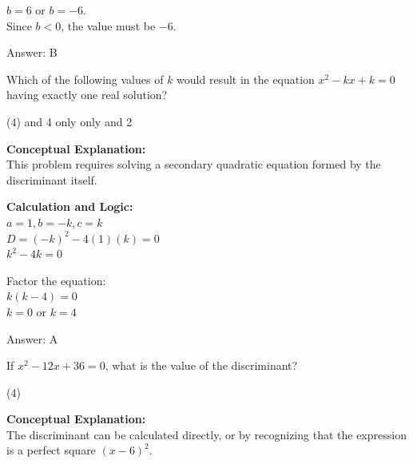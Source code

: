 \documentclass[11pt,paper=a4,answers]{exam}
\begin{document}
\begin{questions}
\begin{solution}
\vspace{10pt}

$b = 6$ or $b = -6$. \\
Since $b < 0$, the value must be $-6$.

\vspace{25pt}

Answer: \colorbox{yellow!100}{B}
\end{solution}

\vspace{40pt}

\question
Which of the following values of $k$ would result in the equation $x^2 - kx + k = 0$ having exactly one real solution?
\begin{tasks}(4)
     and 4
     only
     only
     and 2
\end{tasks}

\begin{solution}
\textbf{Conceptual Explanation:} \\
This problem requires solving a secondary quadratic equation formed by the discriminant itself.

\vspace{20pt}

\textbf{Calculation and Logic:} \\
$a = 1, b = -k, c = k$ \\
$D = (-k)^2 - 4(1)(k) = 0$ \\
$k^2 - 4k = 0$

\vspace{10pt}

Factor the equation: \\
$k(k - 4) = 0$ \\
$k = 0$ or $k = 4$

\vspace{25pt}

Answer: \colorbox{yellow!100}{A}
\end{solution}

\vspace{40pt}

\question
If $x^2 - 12x + 36 = 0$, what is the value of the discriminant?
\begin{tasks}(4)
\end{tasks}

\begin{solution}
\textbf{Conceptual Explanation:} \\
The discriminant can be calculated directly, or by recognizing that the expression is a perfect square $(x-6)^2$.


\end{solution}
\end{questions}
\end{document}
